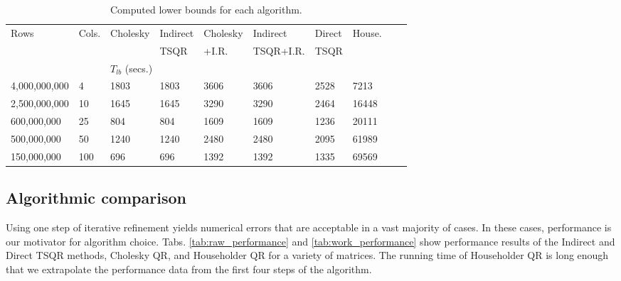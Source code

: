\documentclass[10pt, conference, compsocconf]{IEEEtran}
\begin{document}
\begin{table*}[tbp]
\vspace{-\baselineskip}
\caption{Computed lower bounds for each algorithm.}
\centering
\begin{tabularx}{\linewidth}{llXXXXXXXX}
\toprule
Rows & Cols. & Cholesky & Indirect & Cholesky & Indirect         & Direct & House. \\
           &           &                   & TSQR   & +I.R.         & TSQR+I.R.    & TSQR & \\\cmidrule{3-8}
& & \multicolumn{2}{l}{$T_{lb}$ (secs.)} \\ \midrule
4,000,000,000 & 4   & 1803  & 1803 & 3606 & 3606 & 2528 & 7213\\
2,500,000,000 & 10 & 1645  & 1645 & 3290 & 3290 & 2464 & 16448\\
600,000,000 & 25    & 804    & 804    & 1609 & 1609 & 1236 & 20111\\
500,000,000 & 50    & 1240  & 1240 & 2480 & 2480 & 2095 & 61989\\
150,000,000 & 100  & 696    & 696   & 1392 & 1392 & 1335 & 69569\\
\bottomrule
\end{tabularx}
\label{tab:lower_bounds}
\end{table*}

\subsection{Algorithmic comparison}\label{sec:perf_comparison}

Using one step of iterative refinement yields numerical errors that are acceptable in a vast majority of cases.  In these cases, performance is our motivator for algorithm choice.  Tabs. \ref{tab:raw_performance} and \ref{tab:work_performance} show performance results of the Indirect and Direct TSQR methods, Cholesky QR, and Householder QR for a variety of matrices.  The running time of Householder QR is long enough that we extrapolate the performance data from the first four steps of the algorithm.
\end{document}
